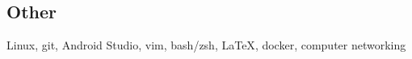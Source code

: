 \documentclass[../Resume.tex]{subfiles}
\begin{document}
    \subsection{Other}
    Linux, git, Android Studio, vim, bash/zsh, {\LaTeX}, docker, computer networking
    \vspace*{-4mm}
\end{document}

